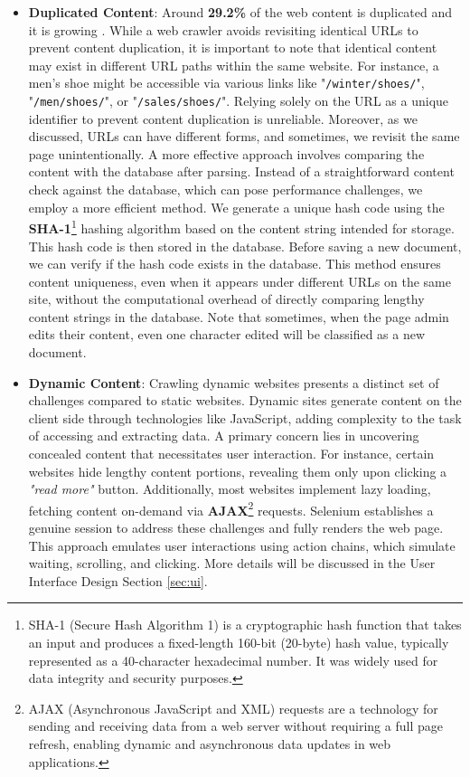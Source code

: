 \begin{itemize}
\item[]  \textbf{Duplicated Content}: Around \textbf{29.2\%} of the web content is duplicated and it is growing \cite{fetterly2003evolution}. While a web crawler avoids revisiting identical URLs to prevent content duplication, it is important to note that identical content may exist in different URL paths within the same website. For instance, a men's shoe might be accessible via various links like "\texttt{/winter/shoes/}", "\texttt{/men/shoes/}", or "\texttt{/sales/shoes/}". Relying solely on the URL as a unique identifier to prevent content duplication is unreliable. Moreover, as we discussed, URLs can have different forms, and sometimes, we revisit the same page unintentionally.
A more effective approach involves comparing the content with the database after parsing. Instead of a straightforward content check against the database, which can pose performance challenges, we employ a more efficient method. We generate a unique hash code using the \textbf{SHA-1}\footnote{
SHA-1 (Secure Hash Algorithm 1) is a cryptographic hash function that takes an input and produces a fixed-length 160-bit (20-byte) hash value, typically represented as a 40-character hexadecimal number. It was widely used for data integrity and security purposes.} hashing algorithm based on the content string intended for storage. This hash code is then stored in the database.
Before saving a new document, we can verify if the hash code exists in the database. This method ensures content uniqueness, even when it appears under different URLs on the same site, without the computational overhead of directly comparing lengthy content strings in the database. Note that sometimes, when the page admin edits their content, even one character edited will be classified as a new document.

\item[]  \textbf{Dynamic Content}: Crawling dynamic websites presents a distinct set of challenges compared to static websites. Dynamic sites generate content on the client side through technologies like JavaScript, adding complexity to the task of accessing and extracting data. A primary concern lies in uncovering concealed content that necessitates user interaction. For instance, certain websites hide lengthy content portions, revealing them only upon clicking a \textit{"read more"} button. Additionally, most websites implement lazy loading, fetching content on-demand via \textbf{AJAX}\footnote{AJAX (Asynchronous JavaScript and XML) requests are a technology for sending and receiving data from a web server without requiring a full page refresh, enabling dynamic and asynchronous data updates in web applications.} requests.
Selenium establishes a genuine session to address these challenges and fully renders the web page. This approach emulates user interactions using action chains, which simulate waiting, scrolling, and clicking. More details will be discussed in the User Interface Design Section \ref{sec:ui}.


\end{itemize}
